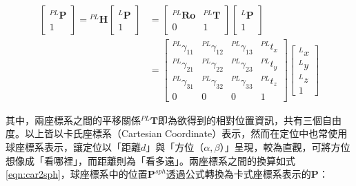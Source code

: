     \begin{equation}
        \label{eqn:homogeneous}
        \begin{aligned}
        {\left[\begin{array}{c}
        { }^{P L} \boldsymbol{P} \\
        1
        \end{array}\right]={ }^{P L} \boldsymbol{H}\left[\begin{array}{c}
        { }^{L} \boldsymbol{P} \\
        1
        \end{array}\right] } &=\left[\begin{array}{cc}
        { }^{P L} \boldsymbol{R} \boldsymbol{o} & { }^{P L} \boldsymbol{T} \\
        0 & 1
        \end{array}\right]\left[\begin{array}{c}
        { }^{L} \boldsymbol{P} \\
        1
        \end{array}\right] \\
        &=\left[\begin{array}{cccc}
        { }^{P L} \gamma_{11} & { }^{P L} \gamma_{12} & { }^{P L} \gamma_{13} & { }^{P L} {t}_{x} \\
        { }^{P L} \gamma_{21} & ^{P L } \gamma_{22} & { }^{P L} \gamma_{23} & { }^{P L} {t}_{y} \\
        { }^{P L} \gamma_{31} & ^{P L} \gamma_{32} & { }^{P L} \gamma_{33} & { }^{P L} {t}_{z} \\
        0 & 0 & 0 & 1
        \end{array}\right]\left[\begin{array}{c}
        { }^{L} {x} \\
        { }^{L} {y} \\
        { }^{L} z \\
        1
        \end{array}\right]
        \end{aligned}
    \end{equation}


    
    
   其中，兩座標系之間的平移關係$^{PL}\boldsymbol{T}$即為欲得到的相對位置資訊，共有三個自由度。以上皆以卡氏座標系（Cartesian Coordinate）表示，然而在定位中也常使用球座標系表示，讓定位以「距離$d$」與「方位（$\alpha,\beta$）」呈現，較為直觀，可將方位想像成「看哪裡」，而距離則為「看多遠」。兩座標系之間的換算如式\ref{eqn:car2sph}，球座標系中的位置$\boldsymbol{P}^{sph}$透過公式轉換為卡式座標系表示的$\boldsymbol{P}$：

